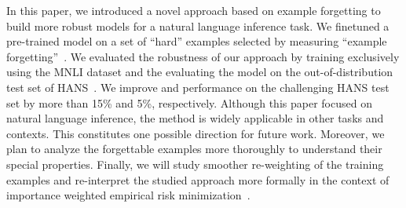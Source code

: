 
In this paper, we introduced a novel approach based on example forgetting to build more robust models for a natural language inference task. We  finetuned a pre-trained model on a set of ``hard'' examples selected by measuring ``example forgetting''~\citep{toneva2018empirical}. We evaluated the robustness of our approach by training exclusively using the MNLI dataset and the evaluating the model on the out-of-distribution test set of HANS~\citep{linzen2019right}. We improve \bertbase and \bertlarge performance on the challenging HANS test set by more than 15\% and 5\%, respectively. Although this paper focused on natural language inference, the method is widely applicable in other tasks and contexts. This constitutes one possible direction for future work. Moreover, we plan to analyze the forgettable examples more thoroughly to understand their special properties. Finally, we will study smoother re-weighting of the training examples and re-interpret the studied approach more formally in the context of importance weighted empirical risk minimization~\citep{sugiyama2007covariate}.

